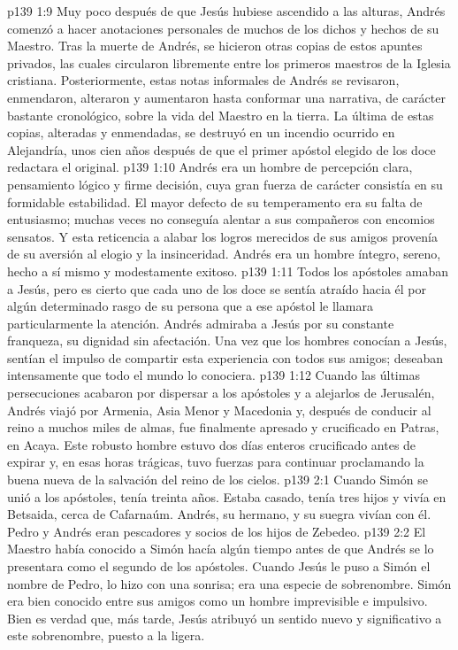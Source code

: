 \vs p139 1:9 Muy poco después de que Jesús hubiese ascendido a las alturas, Andrés comenzó a hacer anotaciones personales de muchos de los dichos y hechos de su Maestro. Tras la muerte de Andrés, se hicieron otras copias de estos apuntes privados, las cuales circularon libremente entre los primeros maestros de la Iglesia cristiana. Posteriormente, estas notas informales de Andrés se revisaron, enmendaron, alteraron y aumentaron hasta conformar una narrativa, de carácter bastante cronológico, sobre la vida del Maestro en la tierra. La última de estas copias, alteradas y enmendadas, se destruyó en un incendio ocurrido en Alejandría, unos cien años después de que el primer apóstol elegido de los doce redactara el original.
\vs p139 1:10 Andrés era un hombre de percepción clara, pensamiento lógico y firme decisión, cuya gran fuerza de carácter consistía en su formidable estabilidad. El mayor defecto de su temperamento era su falta de entusiasmo; muchas veces no conseguía alentar a sus compañeros con encomios sensatos. Y esta reticencia a alabar los logros merecidos de sus amigos provenía de su aversión al elogio y la insinceridad. Andrés era un hombre íntegro, sereno, hecho a sí mismo y modestamente exitoso.
\vs p139 1:11 \pc Todos los apóstoles amaban a Jesús, pero es cierto que cada uno de los doce se sentía atraído hacia él por algún determinado rasgo de su persona que a ese apóstol le llamara particularmente la atención. Andrés admiraba a Jesús por su constante franqueza, su dignidad sin afectación. Una vez que los hombres conocían a Jesús, sentían el impulso de compartir esta experiencia con todos sus amigos; deseaban intensamente que todo el mundo lo conociera.
\vs p139 1:12 \pc Cuando las últimas persecuciones acabaron por dispersar a los apóstoles y a alejarlos de Jerusalén, Andrés viajó por Armenia, Asia Menor y Macedonia y, después de conducir al reino a muchos miles de almas, fue finalmente apresado y crucificado en Patras, en Acaya. Este robusto hombre estuvo dos días enteros crucificado antes de expirar y, en esas horas trágicas, tuvo fuerzas para continuar proclamando la buena nueva de la salvación del reino de los cielos.
\vs p139 2:1 Cuando Simón se unió a los apóstoles, tenía treinta años. Estaba casado, tenía tres hijos y vivía en Betsaida, cerca de Cafarnaúm. Andrés, su hermano, y su suegra vivían con él. Pedro y Andrés eran pescadores y socios de los hijos de Zebedeo.
\vs p139 2:2 El Maestro había conocido a Simón hacía algún tiempo antes de que Andrés se lo presentara como el segundo de los apóstoles. Cuando Jesús le puso a Simón el nombre de Pedro, lo hizo con una sonrisa; era una especie de sobrenombre. Simón era bien conocido entre sus amigos como un hombre imprevisible e impulsivo. Bien es verdad que, más tarde, Jesús atribuyó un sentido nuevo y significativo a este sobrenombre, puesto a la ligera.
